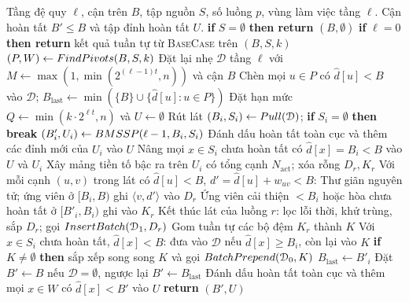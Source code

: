 \begin{algorithm}[htbp]
\caption{Khung đệ quy song song $\textsc{BMSSP}(\ell, B, S)$}
\label{alg:parallel_bmssp}
\small\setlength{\baselineskip}{14pt}
\begin{algorithmic}[1]
\Require Tầng đệ quy $\ell$, cận trên $B$, tập nguồn $S$, số luồng $p$, vùng làm việc tầng $\ell$.
\Ensure Cận hoàn tất $B' \le B$ và tập đỉnh hoàn tất $U$.
\State \textbf{if} $S = \emptyset$ \textbf{then return} $(B, \emptyset)$
\State \textbf{if} $\ell = 0$ \textbf{then return} kết quả tuần tự từ \textsc{BaseCase} trên $(B, S, k)$
\State $(P, W) \leftarrow \textsc{FindPivots}(B, S, k)$
\State Đặt lại nhẹ $\mathcal{D}$ tầng $\ell$ với $M \leftarrow \max(1, \min(2^{(\ell-1)t}, n))$ và cận $B$
\State Chèn mọi $u \in P$ có $\widehat{d}[u] < B$ vào $\mathcal{D}$; $B_{\mathrm{last}} \leftarrow \min(\{B\} \cup \{\widehat{d}[u] : u \in P\})$
\State Đặt hạn mức $Q \leftarrow \min(k \cdot 2^{\ell t}, n)$ và $U \leftarrow \emptyset$
    \State Rút lát $(B_i, S_i) \leftarrow \textsc{Pull}(\mathcal{D})$; \textbf{if} $S_i = \emptyset$ \textbf{then break}
    \State $(B'_i, U_i) \leftarrow \textsc{BMSSP}(\ell - 1, B_i, S_i)$
    \State Đánh dấu hoàn tất toàn cục và thêm các đỉnh mới của $U_i$ vào $U$
        \State Nâng mọi $x \in S_i$ chưa hoàn tất có $\widehat{d}[x] = B_i < B$ vào $U$ và $U_i$
    \EndIf
    \State Xây mảng tiền tố bậc ra trên $U_i$ có tổng cạnh $N_{\mathrm{act}}$; xóa rỗng $D_r, K_r$
     
        \State Với mỗi cạnh $(u, v)$ trong lát có $\widehat{d}[u] < B$, $d' = \widehat{d}[u] + w_{uv} < B$:
        \State \hspace{1em} Thư giãn nguyên tử; ứng viên ở $[B_i, B)$ ghi $\langle v, d' \rangle$ vào $D_r$
        \State \hspace{1em} Ứng viên cải thiện $< B_i$ hoặc hòa chưa hoàn tất ở $[B'_i, B_i)$ ghi vào $K_r$
        \State Kết thúc lát của luồng $r$: lọc lỗi thời, khử trùng, sắp $D_r$; gọi $\textsc{InsertBatch}(\mathcal{D}_1, D_r)$
    \EndFor
    \State Gom tuần tự các bộ đệm $K_r$ thành $K$
    \State Với $x \in S_i$ chưa hoàn tất, $\widehat{d}[x] < B$: đưa vào $\mathcal{D}$ nếu $\widehat{d}[x] \ge B_i$, còn lại vào $K$
    \State \textbf{if} $K \neq \emptyset$ \textbf{then} sắp xếp song song $K$ và gọi $\textsc{BatchPrepend}(\mathcal{D}_0, K)$
    \State $B_{\mathrm{last}} \leftarrow B'_i$
\EndWhile
\State Đặt $B' \leftarrow B$ nếu $\mathcal{D} = \emptyset$, ngược lại $B' \leftarrow B_{\mathrm{last}}$
\State Đánh dấu hoàn tất toàn cục và thêm mọi $x \in W$ có $\widehat{d}[x] < B'$ vào $U$
\State \textbf{return} $(B', U)$
\end{algorithmic}
\end{algorithm}

